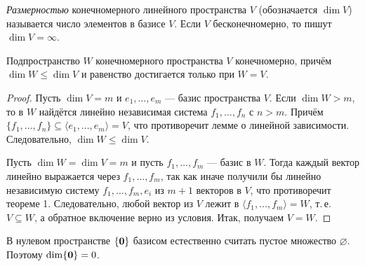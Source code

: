 \begin{definition}
    \textit{Размерностью} конечномерного линейного пространства $V$ (обозначается $\dim V$) называется число элементов в базисе $V$. Если $V$ бесконечномерно, то пишут $\dim V = \infty$.
\end{definition}

\begin{lemma}
    Подпространство $W$ конечномерного пространства $V$ конечномерно, причём $\dim W \leqslant \dim V$ и равенство достигается только при $W = V$.
\end{lemma}

\begin{proof}
    Пусть $\dim V = m$ и $e_1, \ldots, e_m$ --- базис пространства $V$. Если $\dim W > m$, то в $W$ найдётся линейно независимая система $f_1, \ldots, f_n$ с $n > m$. Причём $\{f_1, \ldots, f_n\} \subseteq \langle e_1, \ldots, e_m\rangle = V$, что противоречит лемме о линейной зависимости. Следовательно, $\dim W \leqslant \dim V$.

    Пусть $\dim W = \dim V = m$ и пусть $f_1, \ldots, f_m$ --- базис в $W$. Тогда каждый вектор линейно выражается через $f_1, \ldots, f_m$, так как иначе получили бы линейно независимую систему $f_1, \ldots, f_m, e_i$ из $m + 1$ векторов в $V$, что противоречит теореме 1. Следовательно, любой вектор из $V$ лежит в $\langle f_1, \ldots, f_m\rangle = W$, т.\,е. $V \subseteq W$, а обратное включение верно из условия. Итак, получаем $V = W$.
\end{proof}

\begin{remark}
    В нулевом пространстве $\{\boldsymbol{0}\}$ базисом естественно считать пустое множество $\varnothing$. Поэтому $\dim\{\boldsymbol{0}\} = 0$.
\end{remark}

